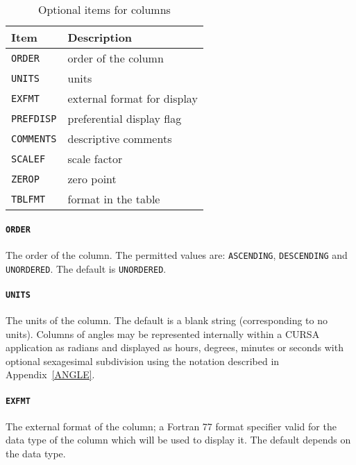 \documentclass[twoside,11pt]{article}
\renewcommand{\_}{\texttt{\symbol{95}}}
\begin{document}
\begin{table}[htbp]

\begin{center}
\begin{tabular}{ll}
Item           & Description                         \\ \hline
{\tt ORDER}    & order of the column                 \\
{\tt UNITS}    & units                               \\
{\tt EXFMT}    & external format for display         \\
{\tt PREFDISP} & preferential display flag           \\
{\tt COMMENTS} & descriptive comments                \\
{\tt SCALEF}   & scale factor                        \\
{\tt ZEROP}    & zero point                          \\
{\tt TBLFMT}   & format in the table                 \\
\end{tabular}

\caption{Optional items for columns \label{COL_OPT} }

\end{center}
\end{table}

\paragraph{{\tt ORDER}} The order of the column.  The permitted values
are: {\tt ASCENDING}, {\tt DESCENDING} and {\tt UNORDERED}.  The default
is {\tt UNORDERED}.

\paragraph{{\tt UNITS}} The units of the column.  The default is a
blank string (corresponding to no units).  Columns of angles may be
represented internally within a CURSA application as radians and displayed
as hours, degrees, minutes or seconds with optional sexagesimal
subdivision using the notation described in Appendix~\ref{ANGLE}.

\paragraph{{\tt EXFMT}}  The external format of the column; a Fortran 77
format specifier valid for the data type of the column which will be
used to display it.  The default depends on the data type.
\end{document}
